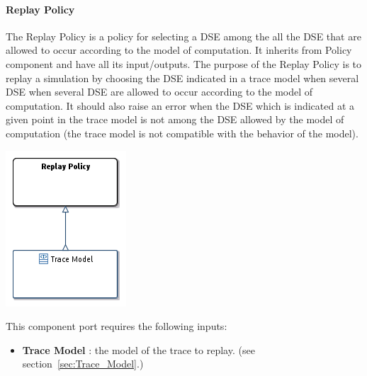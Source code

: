 \documentclass{gemoc} %
\begin{document}
\paragraph{Replay Policy}
\label{sec:Replay_Policy}
The Replay Policy is a policy for selecting a DSE among the all the DSE that are allowed to occur according to the model of computation.
It inherits from Policy component and have all its input/outputs.
The purpose of the Replay Policy is to replay a simulation by choosing the DSE indicated in a trace model when several DSE when several DSE are allowed to occur according to the model of computation. It should also raise an error when the DSE which is indicated at a given point in the trace model is not among the DSE allowed by the model of computation (the trace model is not compatible with the behavior of the model).
\begin{center}
\includegraphics*[trim=0.0cm 0.0cm 0cm 0.0cm, clip=true]{../images/generated/Generated_Replay_Policy.png}
\end{center}

This component port requires the following inputs:
\begin{itemize}
  \item \textbf{Trace Model} :
the model of the trace to replay.
(see section~\ref{sec:Trace_Model}.)
\end{itemize}
\end{document}
